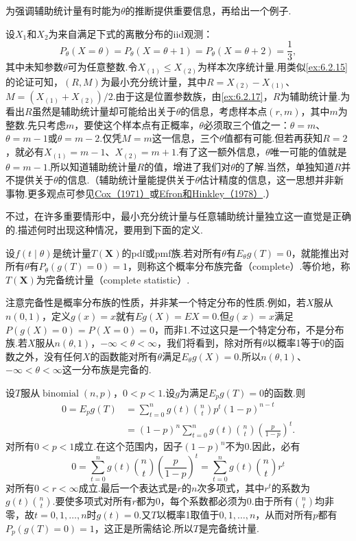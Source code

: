 为强调辅助统计量有时能为$\theta$的推断提供重要信息，再给出一个例子.
\begin{example}[辅助统计量与精度]\label{ex:6.2.20}
设$X_1$和$X_2$为来自满足下式的离散分布的iid观测：
$$P_\theta(X=\theta)=P_\theta(X=\theta+1)=P_\theta(X=\theta+2)=\frac13,$$
其中未知参数$\theta$可为任意整数.令$X_{(1)}\le X_{(2)}$为样本次序统计量.用类似\autoref{ex:6.2.15}的论证可知，$(R,M)$为最小充分统计量，其中$R=X_{(2)}-X_{(1)}$、$M=(X_{(1)}+X_{(2)})/2$.由于这是位置参数族，由\autoref{ex:6.2.17}，$R$为辅助统计量.为看出$R$虽然是辅助统计量却可能给出关于$\theta$的信息，考虑样本点$(r,m)$，其中$m$为整数.先只考虑$m$，要使这个样本点有正概率，$\theta$必须取三个值之一：$\theta=m$、$\theta=m-1$或$\theta=m-2$.仅凭$M=m$这一信息，三个$\theta$值都有可能.但若再获知$R=2$，就必有$X_{(1)}=m-1$、$X_{(2)}=m+1$.有了这一额外信息，$\theta$唯一可能的值就是$\theta=m-1$.所以知道辅助统计量$R$的值，增进了我们对$\theta$的了解.当然，单独知道$R$并不提供关于$\theta$的信息.（辅助统计量能提供关于$\theta$估计精度的信息，这一思想并非新事物.更多观点可参见\hyperref[bib:source85]{Cox（1971）}或\hyperref[bib:source110]{Efron和Hinkley（1978）}.）
\end{example}
不过，在许多重要情形中，最小充分统计量与任意辅助统计量独立这一直觉是正确的.描述何时出现这种情况，要用到下面的定义.
\begin{definition}\label{def:6.2.21}
设$f(t\mid\theta)$是统计量$T(\boldsymbol X)$的pdf或pmf族.若对所有$\theta$有$E_\theta g(T)=0$，就能推出对所有$\theta$有$P_\theta(g(T)=0)=1$，则称这个概率分布族完备（complete）.等价地，称$T(\boldsymbol X)$为完备统计量（complete statistic）.
\end{definition}
注意完备性是概率分布族的性质，并非某一个特定分布的性质.例如，若$X$服从$n(0,1)$，定义$g(x)=x$就有$Eg(X)=EX=0$.但$g(x)=x$满足$P(g(X)=0)=P(X=0)=0$，而非1.不过这只是一个特定分布，不是分布族.若$X$服从$n(\theta,1)$，$-\infty<\theta<\infty$，我们将看到，除对所有$\theta$以概率1等于0的函数之外，没有任何$X$的函数能对所有$\theta$满足$E_\theta g(X)=0$.所以$n(\theta,1)$、$-\infty<\theta<\infty$这一分布族是完备的.
\begin{example}[二项分布的完备充分统计量]\label{ex:6.2.22}
设$T$服从$\operatorname{binomial}(n,p)$，$0<p<1$.设$g$为满足$E_pg(T)=0$的函数.则
\begin{align*}
0=E_pg(T)&=\sum_{t=0}^n g(t)\binom nt p^t(1-p)^{n-t}\\
&=(1-p)^n\sum_{t=0}^n g(t)\binom nt\left(\frac p{1-p}\right)^t.
\end{align*}
对所有$0<p<1$成立.在这个范围内，因子$(1-p)^n$不为0.因此，必有
$$0=\sum_{t=0}^ng(t)\binom nt\left(\frac p{1-p}\right)^t=\sum_{t=0}^ng(t)\binom nt r^t$$
对所有$0<r<\infty$成立.最后一个表达式是$r$的$n$次多项式，其中$r^t$的系数为$g(t)\binom nt$.要使多项式对所有$r$都为0，每个系数都必须为0.由于所有$\binom nt$均非零，故$t=0,1,\ldots,n$时$g(t)=0$.又$T$以概率1取值于$0,1,\ldots,n$，从而对所有$p$都有$P_p(g(T)=0)=1$，这正是所需结论.所以$T$是完备统计量.
\end{example}
